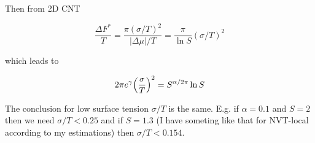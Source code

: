 \documentclass[a4paper,12pt]{article} %
\begin{document}
Then from 2D CNT 

\begin{equation}
\frac{\Delta F^*}{T} = \frac{\pi (\sigma/T)^2}{|\Delta \mu|/T} = \frac{\pi}{\ln S} (\sigma/T)^2
\end{equation}

which leads to

\begin{equation}
2 \pi e^\gamma \qty(\frac{\sigma}{T})^2 = S^{\alpha / 2 \pi} \ln S
\end{equation}

The conclusion for low surface tension $\sigma/T$ is the same. E.g. if $\alpha=0.1$ and $S=2$ then we need $\sigma/T < 0.25$ and if $S=1.3$ (I have someting like that for NVT-local according to my estimations) then $\sigma/T < 0.154$.
\end{document}
